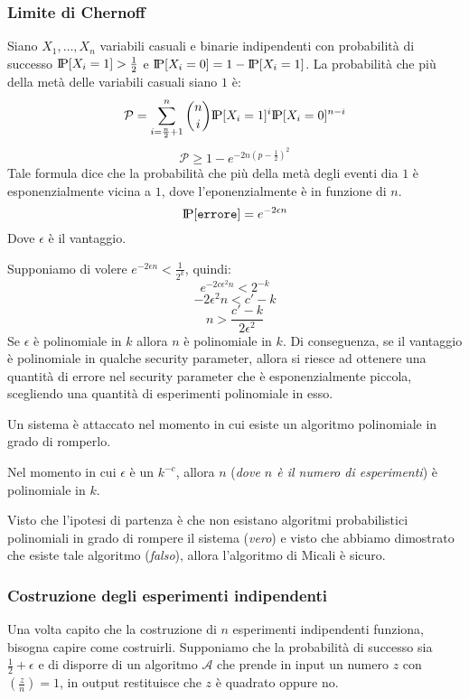 \subsubsection{Limite di Chernoff} \label{limite_chernoff}
\begin{tcolorbox}[title = Limite di Chernoff]
  Siano $X_1, \dots, X_n$ variabili casuali e binarie indipendenti con probabilità 
  di successo $\text{I\kern-0.15em P}[X_i = 1] > \frac{1}{2}$ e $\text{I\kern-0.15em P}[X_i = 0] = 1 - \text{I\kern-0.15em P}[X_i = 1]$.
  La probabilità che più della metà delle variabili casuali siano $1$ è:
  \[
    \mathcal{P} = \sum_{i = \frac{n}{2} + 1}^n \binom{n}{i} \text{I\kern-0.15em P}[X_i = 1]^i \text{I\kern-0.15em P}[X_i = 0]^{n - i}
  \]
  \[
    \mathcal{P} \geq 1 - e^{-2n\left(p - \frac{1}{2}\right)^2}
  \]
  Tale formula dice che la probabilità che più della metà degli eventi dia $1$ è 
  esponenzialmente vicina a $1$, dove l'eponenzialmente è in funzione di $n$.
  \[
    \text{I\kern-0.15em P}[\texttt{errore}] = e^{-2 \epsilon n}
  \]
  Dove $\epsilon$ è il vantaggio.
\end{tcolorbox}
Supponiamo di volere $e^{-2 \epsilon n} < \frac{1}{2^k}$, quindi:
\[
  e^{-2c\epsilon^2 n} < 2^{-k}
\]
\[
  -2\epsilon^2 n < c' - k 
\]
\[
  n > \frac{c' - k}{2\epsilon^2}
\]
Se $\epsilon$ è polinomiale in $k$ allora $n$ è polinomiale in $k$.
Di conseguenza, se il vantaggio è polinomiale in qualche security parameter, allora
si riesce ad ottenere una quantità di errore nel security parameter che è
esponenzialmente piccola, scegliendo una quantità di esperimenti polinomiale in esso.

Un sistema è attaccato nel momento in cui esiste un algoritmo polinomiale in 
grado di romperlo.

Nel momento in cui $\epsilon$ è un $k^{-c}$, allora $n$ (\textit{dove $n$ è il numero di
esperimenti}) è polinomiale in $k$.

Visto che l'ipotesi di partenza è che non esistano algoritmi probabilistici polinomiali in grado
di rompere il sistema (\textit{vero}) e visto che abbiamo dimostrato che esiste tale algoritmo (\textit{falso}), allora
l'algoritmo di Micali è sicuro.
\subsubsection{Costruzione degli esperimenti indipendenti}

Una volta capito che la costruzione di $n$ esperimenti indipendenti funziona, bisogna 
capire come costruirli. Supponiamo che la probabilità di successo sia $\frac{1}{2} + \epsilon$ e
di disporre di un algoritmo $\mathcal{A}$ che prende in input un numero $z$ 
con $\left(\frac{z}{n}\right) = 1$, in output restituisce che $z$ è quadrato oppure no.

